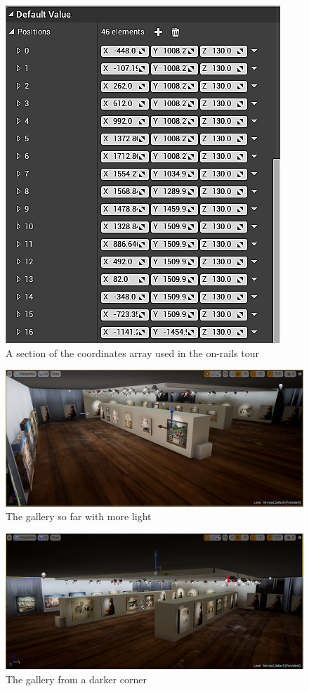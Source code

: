 \begin{figure}
	\caption{A section of the coordinates array used in the on-rails tour}
	\centering
	\includegraphics[scale=0.5]{SprintReports/Sprint3/Waypoint.png}
\end{figure}

\begin{figure}
	\caption{The gallery so far with more light}
	\centering
	\includegraphics[scale=0.5]{SprintReports/Sprint3/Example1.png}
\end{figure}

\begin{figure}
	\caption{The gallery from a darker corner}
	\centering
	\includegraphics[scale=0.5]{SprintReports/Sprint3/Example2.png}
\end{figure}
